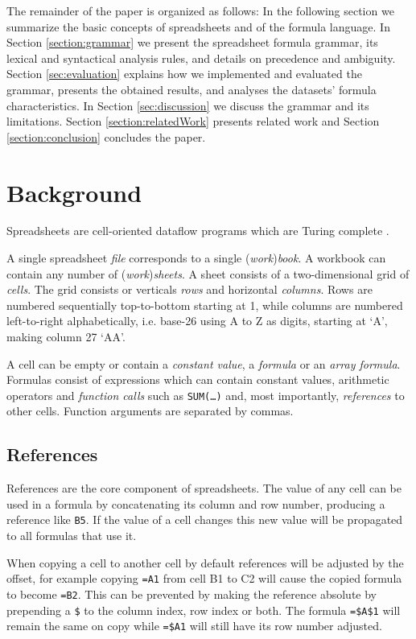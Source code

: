 \documentclass[conference]{IEEEtran}
\begin{document}
The remainder of the paper is organized as follows: In the following section we summarize the basic concepts of spreadsheets and of the formula language. In Section \ref{section:grammar} we present the spreadsheet formula grammar, its lexical and syntactical analysis rules, and details on precedence and ambiguity. Section \ref{sec:evaluation} explains how we implemented and evaluated the grammar, presents the obtained results, and analyses the datasets' formula characteristics. In Section \ref{sec:discussion} we discuss the grammar and its limitations. Section \ref{section:relatedWork} presents related work and Section \ref{section:conclusion} concludes the paper.

\section{Background}

Spreadsheets are cell-oriented dataflow programs which are Turing complete \cite{ExcelTuringComplete}.

A single spreadsheet \emph{file} corresponds to a single (\emph{work})\emph{book}.
A workbook can contain any number of (\emph{work})\emph{sheets}.
A sheet consists of a two-dimensional grid of \emph{cells}.
The grid consists or verticals \emph{rows} and horizontal \emph{columns}.
Rows are numbered sequentially top-to-bottom starting at 1, while columns are numbered left-to-right alphabetically, i.e. base-26 using A to Z as digits, starting at `A', making column 27 `AA'.

A cell can be empty or contain a \emph{constant value}, a \emph{formula} or an \emph{array formula}.
Formulas consist of expressions which can contain constant values, arithmetic operators and \emph{function calls} such as \texttt{SUM(\ldots)} and, most importantly, \emph{references} to other cells.
Function arguments are separated by commas.

\subsection{References}
References are the core component of spreadsheets.
The value of any cell can be used in a formula by concatenating its column and row number, producing a reference like \texttt{B5}.
If the value of a cell changes this new value will be propagated to all formulas that use it.

When copying a cell to another cell by default references will be adjusted by the offset, for example copying \texttt{=A1} from cell B1 to C2 will cause the copied formula to become \texttt{=B2}.
This can be prevented by making the reference absolute by prepending a \texttt{\$} to the column index, row index or both.
The formula \texttt{=\$A\$1} will remain the same on copy while \texttt{=\$A1} will still have its row number adjusted.
\end{document}
